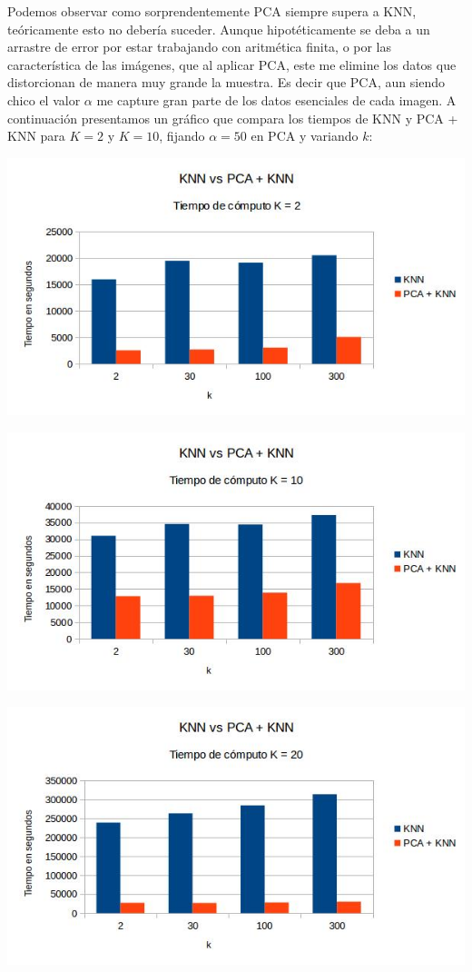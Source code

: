 Podemos observar como sorprendentemente PCA siempre supera a KNN, teóricamente esto no debería suceder. Aunque hipotéticamente se deba a un arrastre de error por estar trabajando con aritmética finita, o por las característica de las imágenes, que al aplicar PCA, este me elimine los datos que distorcionan de manera muy grande la muestra. Es decir que PCA, aun siendo chico el valor $\alpha$ me capture gran parte de los datos esenciales de cada imagen.
\newline
\newline
A continuación presentamos un gráfico que compara los tiempos de KNN y PCA + KNN para $K = 2$ y $K = 10$, fijando $\alpha = 50$ en PCA y variando $k$:
\newline
\newline
\centerline{
\includegraphics[scale=0.5]{Tablas/comtcK2.jpg}
}
\centerline{
\includegraphics[scale=0.5]{Tablas/comtcK10.jpg}
}
\centerline{
\includegraphics[scale=0.5]{Tablas/comtcK20.jpg}
}

